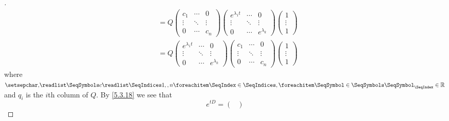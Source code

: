 \begin{proof}[]
\begin{align*}
		     & = Q \begin{pmatrix}
			           c_1    & \cdots & 0      \\
			           \vdots & \ddots & \vdots \\
			           0      & \cdots & c_n
		           \end{pmatrix} \begin{pmatrix}
			                         e^{\lambda_1 t} & \cdots & 0             \\
			                         \vdots          & \ddots & \vdots        \\
			                         0               & \cdots & e^{\lambda_k}
		                         \end{pmatrix} \begin{pmatrix}
			                                       1      \\
			                                       \vdots \\
			                                       1
		                                       \end{pmatrix}                                         \\
		     & = Q \begin{pmatrix}
			           e^{\lambda_1 t} & \cdots & 0             \\
			           \vdots          & \ddots & \vdots        \\
			           0               & \cdots & e^{\lambda_k}
		           \end{pmatrix} \begin{pmatrix}
			                         c_1    & \cdots & 0      \\
			                         \vdots & \ddots & \vdots \\
			                         0      & \cdots & c_n
		                         \end{pmatrix} \begin{pmatrix}
			                                       1      \\
			                                       \vdots \\
			                                       1
		                                       \end{pmatrix}
	\end{align*}
	where \(\seq{c}{1,,n} \in \R\) and \(q_i\) is the \(i\)th column of \(Q\).
	By \cref{5.3.18} we see that
	\[
		e^{tD} = \begin{pmatrix}

\end{pmatrix}\]
\end{proof}
